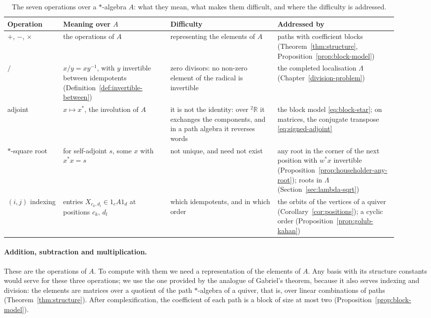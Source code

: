 \documentclass[12pt, a4paper]{report}
\theoremstyle{plain}
\theoremstyle{definition}
\theoremstyle{remark}
\theoremstyle{plain}
\newcommand{\twoR}{{}^{2}\mathbb{R}}
\newcommand{\rowrule}{\arrayrulecolor{black!30}\midrule[0.3pt]\arrayrulecolor{black}}
\begin{document}
\begin{table}[htbp]
\centering
\caption{The seven operations over a $*$-algebra $A$: what they mean, what makes them difficult, and where the difficulty is addressed.}
\label{tab:operations}
\small
\renewcommand{\arraystretch}{1.25}
\begin{tabular}{@{}>{\raggedright\arraybackslash}p{0.13\linewidth}>{\raggedright\arraybackslash}p{0.25\linewidth}>{\raggedright\arraybackslash}p{0.25\linewidth}>{\raggedright\arraybackslash}p{0.29\linewidth}@{}}
\toprule
\textbf{Operation} & \textbf{Meaning over $A$} & \textbf{Difficulty} & \textbf{Addressed by} \\
\midrule
$+$, $-$, $\times$ & the operations of $A$ & representing the elements of $A$ & paths with coefficient blocks (Theorem~\ref{thm:structure}, Proposition~\ref{prop:block-model}) \\
\rowrule
$/$ & $x/y=xy^{-1}$, with $y$ invertible between idempotents (Definition~\ref{def:invertible-between}) & zero divisors: no non-zero element of the radical is invertible & the completed localisation $\Lambda$ (Chapter~\ref{division-problem}) \\
\rowrule
adjoint & $x\mapsto x^*$, the involution of $A$ & it is not the identity: over $\twoR$ it exchanges the components, and in a path algebra it reverses words & the block model \eqref{eq:block-star}; on matrices, the conjugate transpose \eqref{eq:signed-adjoint} \\
\rowrule
$*$-square root & for self-adjoint $s$, some $x$ with $x^*x=s$ & not unique, and need not exist & any root in the corner of the next position with $w^*x$ invertible (Proposition~\ref{prop:householder-any-root}); roots in $\Lambda$ (Section~\ref{sec:lambda-sqrt}) \\
\rowrule
$(i,j)$ indexing & entries $X_{c_k,d_l}\in1_cA1_d$ at positions $c_k$, $d_l$ & which idempotents, and in which order & the orbits of the vertices of a quiver (Corollary~\ref{cor:positions}); a cyclic order (Proposition~\ref{prop:golub-kahan}) \\
\bottomrule
\end{tabular}
\end{table}

\paragraph{Addition, subtraction and multiplication.} These are the operations of $A$. To compute with them we need a representation of the elements of $A$. Any basis with its structure constants would serve for these three operations; we use the one provided by the analogue of Gabriel's theorem, because it also serves indexing and division: the elements are matrices over a quotient of the path $*$-algebra of a quiver, that is, over linear combinations of paths (Theorem~\ref{thm:structure}). After complexification, the coefficient of each path is a block of size at most two (Proposition~\ref{prop:block-model}).
\end{document}

